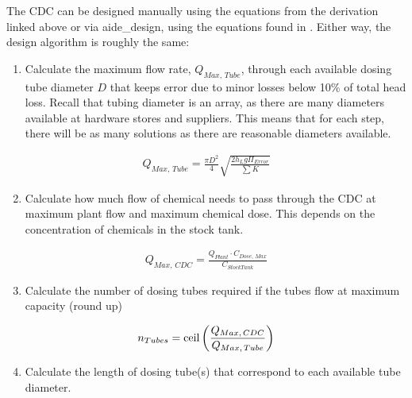 \documentclass[letterpaper,10pt,english]{sphinxmanual}
\begin{document}
The CDC can be designed manually using the equations from the derivation linked above or via aide\_design, using the equations found in . Either way, the design algorithm is roughly the same:
\begin{enumerate}
\item {} 
Calculate the maximum flow rate, \(Q_{Max, \, Tube}\), through each available dosing tube diameter \(D\) that keeps error due to minor losses below 10\% of total head loss. Recall that tubing diameter is an array, as there are many diameters available at hardware stores and suppliers. This means that for each step, there will be as many solutions as there are reasonable diameters available.

\end{enumerate}
\begin{equation}\label{equation:Flow_Control_and_Measurement/FCM_Design:Flow_Control_and_Measurement/FCM_Design:3}
\begin{split}Q_{Max, \, Tube} = \frac{\pi D^2}{4} \sqrt{\frac{2 h_L g \Pi_{Error}}{\sum{K} }}\end{split}
\end{equation}\begin{enumerate}
\setcounter{enumi}{1}
\item {} 
Calculate how much flow of chemical needs to pass through the CDC at maximum plant flow and maximum chemical dose. This depends on the concentration of chemicals in the stock tank.

\end{enumerate}
\begin{equation}\label{equation:Flow_Control_and_Measurement/FCM_Design:Flow_Control_and_Measurement/FCM_Design:4}
\begin{split}Q_{Max, \, CDC} = \frac{Q_{Plant} \cdot C_{Dose, \, Max}}{C_{StockTank}}\end{split}
\end{equation}\begin{enumerate}
\setcounter{enumi}{2}
\item {} 
Calculate the number of dosing tubes required if the tubes flow at  maximum capacity (round up)

\end{enumerate}
\begin{equation}\label{equation:Flow_Control_and_Measurement/FCM_Design:Flow_Control_and_Measurement/FCM_Design:5}
\begin{split}n_{Tubes} = {\rm ceil} \left( \frac{Q_{Max, \, CDC}}{Q_{Max, \, Tube}} \right)\end{split}
\end{equation}\begin{enumerate}
\setcounter{enumi}{3}
\item {} 
Calculate the length of dosing tube(s) that correspond to each available tube diameter.

\end{enumerate}
\end{document}
